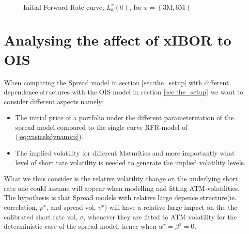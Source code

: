 \documentclass[12pt]{article}
\begin{document}
\begin{figure}[H]
\\
\caption{Initial Forward Rate curve, $L_k^{x}(0)$,
for $x = \left\{ \text{3M}, \text{6M} \right\} $}
\label{fig:NSSfwdLib}
\end{figure}



\section{Analysing the affect of xIBOR to OIS}
When comparing the Spread model in section \ref{sec:the_setup}
with different dependence structures with
the OIS model in section \ref{sec:the_setup}
we want to consider different aspects namely:
\begin{itemize}
     \item The initial price of a portfolio under
     the different parameterization of the spread model
     compared to the single curve RFR-model of (\ref{eq:vasicekdynamics}).
     \item The implied volatility for different Maturities
     and more importantly what level of short rate
     volatility is needed to generate the implied volatility levels.
 \end{itemize}
What we thus consider is the relative
volatility change on the underlying short rate
one could assume will appear when modelling and fitting
ATM-volatilities. The hypothesis
is that Spread models with relative
large depence structure(ie. correlation, $\rho^x$, and
spread vol, $v^x$) will have a relative large impact on the
the calibrated short rate vol, $\sigma$, whenever they are fitted
to ATM volatility for the deterministic case of the spread model,
hence when $\alpha^x = \beta ^x = 0$. \newline
\end{document}

